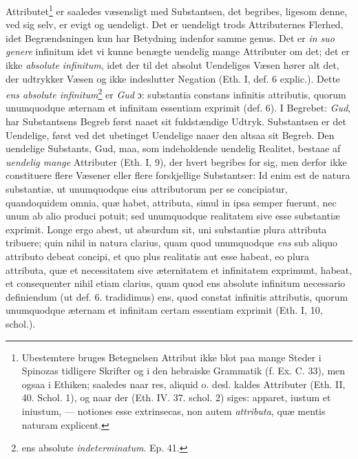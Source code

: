 \documentclass[12pt,a4paper]{book}
\newcommand{\opage}[1]{\marginnote{\footnotesize\textit{[#1]}}}
\begin{document}
Attributet\footnote{Ubestemtere bruges Betegnelsen Attribut ikke blot
paa mange Steder i Spinozas tidligere Skrifter og i den hebraiske
Grammatik (f. Ex. C. 33), men ogsaa i Ethiken; saaledes naar res,
aliquid o. desl. kaldes Attributer (Eth. II, 40. Schol. 1), og naar der
(Eth. IV. 37. schol. 2) siges: apparet, iustum et iniustum, ---
notiones esse extrinsecas, non autem \emph{attributa}, quæ mentis naturam
explicent.} er saaledes væsensligt med Substantsen, det begribes,
ligesom denne, ved sig selv, er evigt og uendeligt. Det er uendeligt
trods Attributernes Flerhed, idet Begrændsningen kun har Betydning
indenfor samme genus. Det er \emph{in suo genere} infinitum idet vi
kunne benægte uendelig mange Attributer om det; det er ikke
\emph{absolute infinitum}, idet der til det absolut Uendeliges Væsen
hører alt det, der udtrykker Væsen og ikke indeslutter Negation (Eth.
I, def. 6 explic.). Dette \emph{ens absolute infinitum}\footnote{ens
absolute \emph{indeterminatum}. Ep. 41.} er \emph{Gud} ɔ: substantia constans
infinitis attributis, quorum unumquodque æternam et infinitam
essentiam exprimit (def. 6). I Begrebet: \emph{Gud}, har Substantsens Begreb
først naaet sit fuldstændige Udtryk. Substantsen er det Uendelige,
først ved det ubetinget Uendelige naaer den altsaa sit Begreb. Den
uendelige Substants, Gud, maa, som indeholdende uendelig Realitet,
bestaae af \emph{uendelig mange} Attributer (Eth. I, 9), der hvert
begribes for sig, men derfor ikke
\opage{50} \setcounter{footnote}{0}%
constituere flere Væsener eller flere forskjellige Substantser: Id enim
est de natura substantiæ, ut unumquodque eius attributorum per se
concipiatur, quandoquidem omnia, quæ habet, attributa, simul in ipsa
semper fuerunt, nec unum ab alio produci potuit; sed unumquodque
realitatem sive esse substantiæ exprimit. Longe ergo abest, ut
absurdum sit, uni substantiæ plura attributa tribuere; quin nihil in
natura clarius, quam quod unumquodque \emph{ens} sub aliquo attributo debeat
concipi, et quo plus realitatis aut esse habeat, eo plura attributa,
quæ et necessitatem sive æternitatem et infinitatem exprimunt, habeat,
et consequenter nihil etiam clarius, quam quod ens absolute infinitum
necessario definiendum (ut def. 6. tradidimus) ens, quod constat
infinitis attributis, quorum unumquodque æternam et infinitam certam
essentiam exprimit (Eth. I, 10, schol.).
\end{document}
